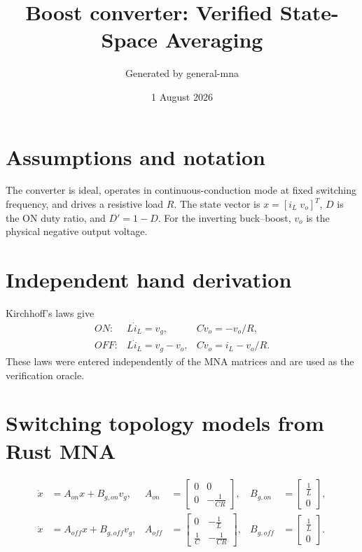 \documentclass[11pt]{article}
\title{Boost converter: Verified State-Space Averaging}
\author{Generated by general-mna}
\date{1 August 2026}
\begin{document}
\maketitle

\section*{Assumptions and notation}
The converter is ideal, operates in continuous-conduction mode at fixed
switching frequency, and drives a resistive load $R$. The state vector is
$x=[i_L\;v_o]^T$, $D$ is the ON duty ratio, and $D'=1-D$. For the inverting
buck--boost, $v_o$ is the physical negative output voltage.

\section*{Independent hand derivation}
Kirchhoff's laws give
\begin{align}
ON: & L\dot i_L=v_g, & C\dot v_o=-v_o/R,\\
OFF: & L\dot i_L=v_g-v_o, & C\dot v_o=i_L-v_o/R.
\end{align}
These laws were entered independently of the MNA matrices and are used as the
verification oracle.

\section*{Switching topology models from Rust MNA}
\begin{align}
\dot x &= A_{on}x+B_{g,on}v_g,
&A_{on}&=\left[\begin{matrix}0 & 0\\0 & - \frac{1}{C R}\end{matrix}\right],
&B_{g,on}&=\left[\begin{matrix}\frac{1}{L}\\0\end{matrix}\right],\\
\dot x &= A_{off}x+B_{g,off}v_g,
&A_{off}&=\left[\begin{matrix}0 & - \frac{1}{L}\\\frac{1}{C} & - \frac{1}{C R}\end{matrix}\right],
&B_{g,off}&=\left[\begin{matrix}\frac{1}{L}\\0\end{matrix}\right].
\end{align}
\end{document}
